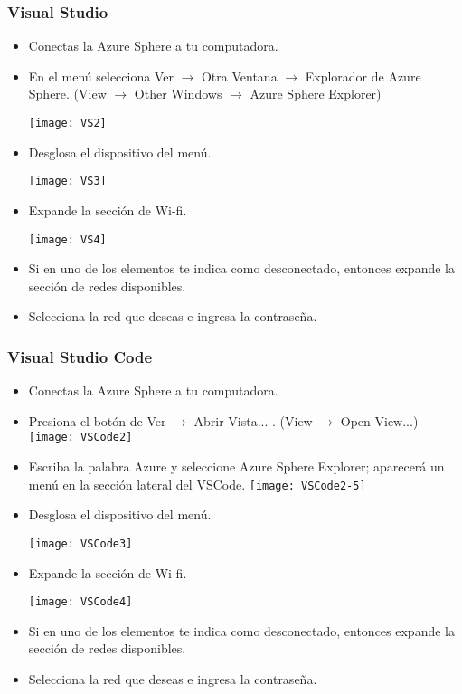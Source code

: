 \subsubsection{Visual Studio}
\begin{itemize}
	\item
	Conectas la Azure Sphere a tu computadora.
	\item 
	En el menú selecciona Ver $\rightarrow$ Otra Ventana $\rightarrow$ Explorador de Azure Sphere.
	(View $\rightarrow$ Other Windows $\rightarrow$ Azure Sphere Explorer)
	
	\texttt{[image: VS2]}
	\pagebreak
	\item 
	Desglosa el dispositivo del menú. 
	
	\texttt{[image: VS3]}
	\pagebreak
	\item 
	Expande la sección de Wi-fi.

	\texttt{[image: VS4]}
	\item 
	Si en uno de los elementos te indica como desconectado, entonces expande la sección de redes disponibles.
	\item 
	Selecciona la red que deseas e ingresa la contraseña.
\end{itemize}
\pagebreak
\subsubsection{Visual Studio Code}
\begin{itemize}
	\item
	Conectas la Azure Sphere a tu computadora.
	\item 
	Presiona el botón de Ver $\rightarrow$ Abrir Vista... . (View $\rightarrow$ Open View...)
	\texttt{[image: VSCode2]}
	\item 
	Escriba la palabra Azure y seleccione Azure Sphere Explorer; aparecerá un menú en la sección lateral del VSCode.  
	\linebreak
	\texttt{[image: VSCode2-5]}
	\pagebreak
	\item 
	Desglosa el dispositivo del menú. 

	\texttt{[image: VSCode3]}
	\item 
	Expande la sección de Wi-fi.

	\texttt{[image: VSCode4]}
	\item 
	Si en uno de los elementos te indica como desconectado, entonces expande la sección de redes disponibles.
	\item 
	Selecciona la red que deseas e ingresa la contraseña.
\end{itemize}

